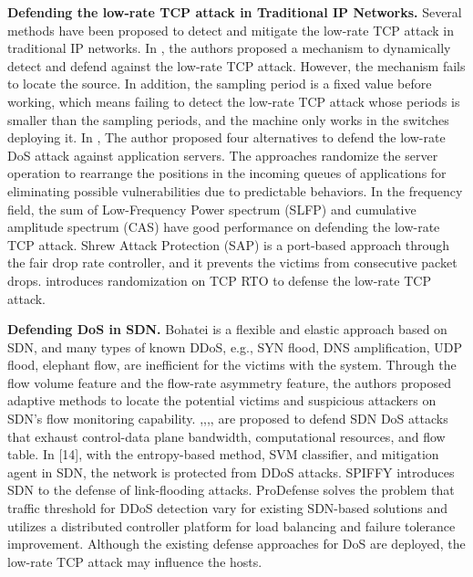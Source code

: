 \documentclass[conference]{IEEEtran}
\begin{document}
\noindent \textbf{Defending the low-rate TCP attack in Traditional IP Networks.} Several methods have been proposed to detect and mitigate the low-rate TCP attack in traditional IP networks. In \cite{b4}, the authors proposed a mechanism to dynamically detect and defend against the low-rate TCP attack. However, the mechanism fails to locate the source. In addition, the sampling period is a fixed value before working, which means failing to detect the low-rate TCP attack whose periods is smaller than the sampling periods, and the machine only works in the switches deploying it. In \cite{b5}, The author proposed four alternatives to defend the low-rate DoS attack against application servers. The approaches randomize the server operation to rearrange the positions in the incoming queues of applications for eliminating possible vulnerabilities due to predictable behaviors. In the frequency field, the sum of Low-Frequency Power spectrum (SLFP) \cite{b6} and cumulative amplitude spectrum (CAS) \cite{b7} have good performance on defending the low-rate TCP attack. Shrew Attack Protection (SAP) \cite{b8} is a port-based approach through the fair drop rate controller, and it prevents the victims from consecutive packet drops. \cite{b17} introduces randomization on TCP RTO to defense the low-rate TCP attack. 


\noindent \textbf{Defending DoS in SDN.} Bohatei \cite{b9} is a ﬂexible and elastic approach based on SDN, and many types of known DDoS, e.g., SYN flood, DNS amplification, UDP flood, elephant flow, are inefficient for the victims with the system. Through the flow volume feature and the flow-rate asymmetry feature, the authors proposed adaptive methods to locate the potential victims and suspicious attackers on SDN's flow monitoring capability. \cite{b10},\cite{b12},\cite{b13},\cite{b15},\cite{b18} are proposed to defend SDN DoS attacks that exhaust control-data plane bandwidth, computational resources, and flow table. In [14], with the entropy-based method, SVM classifier, and mitigation agent in SDN, the network is protected from DDoS attacks. SPIFFY \cite{b16} introduces SDN to the defense of link-flooding attacks. ProDefense \cite{b11} solves the problem that traffic threshold for DDoS detection vary for existing SDN-based solutions and utilizes a distributed controller platform for load balancing and failure tolerance improvement. Although the existing defense approaches for DoS are deployed, the low-rate TCP attack may influence the hosts.
\end{document}
